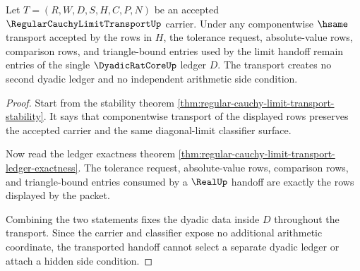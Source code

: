 \begin{theorem}
\label{thm:regular-cauchy-limit-transport-dyadic-ledger-stability}
Let $T=(R,W,D,S,H,C,P,N)$ be an accepted $\RegularCauchyLimitTransportUp$ carrier. Under any componentwise $\hsame$ transport accepted by the rows in $H$, the tolerance request, absolute-value rows, comparison rows, and triangle-bound entries used by the limit handoff remain entries of the single $\DyadicRatCoreUp$ ledger $D$. The transport creates no second dyadic ledger and no independent arithmetic side condition.
\end{theorem}
\begin{proof}
Start from the stability theorem \autoref{thm:regular-cauchy-limit-transport-stability}. It says that componentwise transport of the displayed rows preserves the accepted carrier and the same diagonal-limit classifier surface.

Now read the ledger exactness theorem \autoref{thm:regular-cauchy-limit-transport-ledger-exactness}. The tolerance request, absolute-value rows, comparison rows, and triangle-bound entries consumed by a $\RealUp$ handoff are exactly the rows displayed by the packet.

Combining the two statements fixes the dyadic data inside $D$ throughout the transport. Since the carrier and classifier expose no additional arithmetic coordinate, the transported handoff cannot select a separate dyadic ledger or attach a hidden side condition.
\end{proof}

